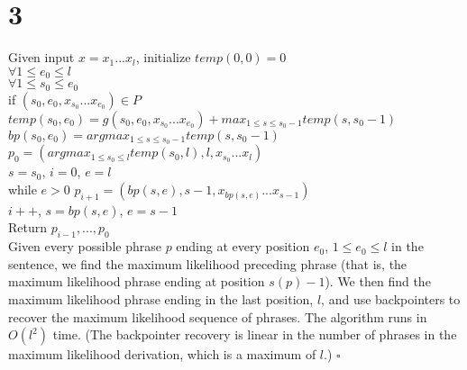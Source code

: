 \documentclass[twoside]{homework}
\begin{document}
\section*{3}
Given input $x = x_1...x_l$, initialize $temp(0,0) = 0$ \\
$\forall 1 \leq e_0 \leq l$ \\
\indent $\forall 1 \leq s_0 \leq e_0$ \\
\indent \indent if $(s_0, e_0, x_{s_0}...x_{e_0}) \in P$ \\
\indent \indent \indent $temp(s_0,e_0) = g(s_0, e_0, x_{s_0}...x_{e_0}) + max_{1 \leq s \leq s_0 - 1} temp(s,s_0 - 1)$ \\
\indent \indent \indent $bp(s_0,e_0) = argmax_{1 \leq s \leq s_0 - 1} temp(s,s_0 - 1)$ \\
$p_0 = (argmax_{1 \leq s_0 \leq l} temp(s_0,l), l, x_{s_0}...x_l)$ \\
$s = s_0$, $i = 0$, $e = l$ \\
while $e > 0$
\indent $p_{i+1} = (bp(s,e), s-1, x_{bp(s,e)}...x_{s-1})$ \\
\indent $i++$, $s = bp(s,e)$, $e = s-1$ \\
Return $p_{i-1}, ..., p_0$ \\
Given every possible phrase $p$ ending at every position $e_0$, $1 \leq e_0 \leq l$ in the sentence, we find the maximum likelihood preceding phrase (that is, the maximum likelihood phrase ending at position $s(p)-1$).  We then find the maximum likelihood phrase ending in the last position, $l$, and use backpointers to recover the maximum likelihood sequence of phrases.  The algorithm runs in $O(l^2)$ time.  (The backpointer recovery is linear in the number of phrases in the maximum likelihood derivation, which is a maximum of $l$.)
$\square$
\end{document}
